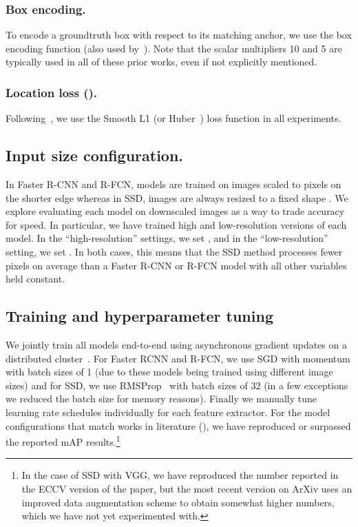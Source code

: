 \documentclass[10pt,twocolumn,letterpaper]{article}
\renewcommand{\paragraph}[1]{\subsubsection{#1}}
\begin{document}
\paragraph{Box encoding.} To encode a groundtruth box with respect to its matching anchor, we use the box encoding function  (also used by~\cite{girshick2014rich,girshick2015fast,ren2015faster,liu2015ssd}). Note that the scalar multipliers 10 and 5 are typically used in all of these prior works, even if not explicitly mentioned.


\paragraph{Location loss ().} Following~\cite{girshick2015fast,ren2015faster,liu2015ssd}, we use the Smooth L1 (or Huber~\cite{huber1964robust}) loss function in all experiments.


\subsection{Input size configuration.}
In Faster R-CNN and R-FCN, models are trained on images scaled to 
pixels on the shorter edge whereas in SSD,  images are always resized
to a fixed shape .  We explore evaluating each model on
downscaled images as a way to trade accuracy for speed.  In particular, we have trained high and low-resolution versions of each model.  
In the ``high-resolution'' settings, we set , and in the ``low-resolution'' setting, we set .  In both cases, this means that the SSD method processes  fewer pixels on average than a Faster R-CNN or R-FCN model with all other variables held constant.   


\subsection{Training and hyperparameter tuning}
We jointly train all models end-to-end using asynchronous gradient
updates on a distributed cluster~\cite{dean2012large}.  For Faster RCNN and R-FCN, 
we use SGD with momentum with batch sizes of 1 (due to these models being 
trained using different image sizes) and for 
SSD, we use RMSProp~\cite{tieleman2012lecture} with batch sizes of 32 (in a few 
exceptions we reduced the batch size for memory reasons).  Finally we 
manually tune learning rate schedules
individually for each feature extractor.  For the model configurations that match works in literature (\cite{ren2015faster,dai2016r,he2015deep,liu2015ssd}), we have reproduced or surpassed the reported mAP results.\footnote{In the case of SSD with VGG, we have reproduced the number reported in the ECCV version of the paper, but the most recent version on ArXiv uses an improved data augmentation scheme to obtain somewhat higher numbers, which we have not yet experimented with.}
\end{document}
